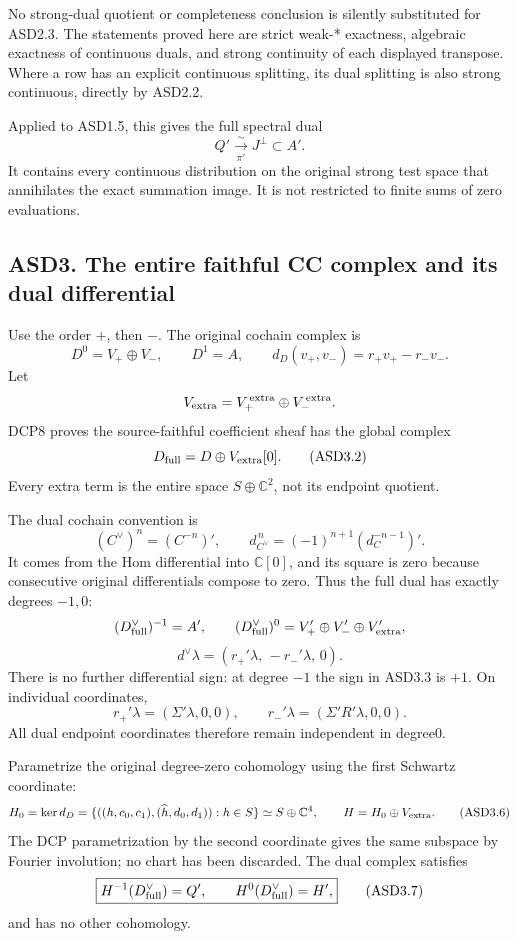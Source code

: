 No strong-dual quotient or completeness conclusion is silently
substituted for ASD2.3. The statements proved here are strict weak-*
exactness, algebraic exactness of continuous duals, and strong
continuity of each displayed transpose. Where a row has an explicit
continuous splitting, its dual splitting is also strong continuous,
directly by ASD2.2.

Applied to ASD1.5, this gives the full spectral dual \[
 \boxed{Q'\xrightarrow[\pi']{\ \sim\ }J^\perp\subset A'.}
 \tag{ASD2.4}
\] It contains every continuous distribution on the original strong test
space that annihilates the exact summation image. It is not restricted
to finite sums of zero evaluations.

\subsection{ASD3. The entire faithful CC complex and its dual
differential}\label{asd3.-the-entire-faithful-cc-complex-and-its-dual-differential}

Use the order \(+\), then \(-\). The original cochain complex is \[
 D^0=V_+\oplus V_-,\qquad D^1=A,\qquad
 d_D(v_+,v_-)=r_+v_+-r_-v_-.
 \tag{ASD3.1}
\] Let \[
 V_{\rm extra}=V_+^{\,{\rm extra}}\oplus V_-^{\,{\rm extra}}.
\] DCP8 proves the source-faithful coefficient sheaf has the global
complex \[
 D_{\rm full}=D\oplus V_{\rm extra}[0].
 \tag{ASD3.2}
\] Every extra term is the entire space \(S\oplus\mathbb C^2\), not its
endpoint quotient.

The dual cochain convention is \[
 (C^\vee)^n=(C^{-n})',\qquad
 d_{C^\vee}^{\,n}=(-1)^{n+1}(d_C^{-n-1})'.
 \tag{ASD3.3}
\] It comes from the Hom differential into \(\mathbb C[0]\), and its
square is zero because consecutive original differentials compose to
zero. Thus the full dual has exactly degrees \(-1,0\): \[
 (D_{\rm full}^\vee)^{-1}=A',\qquad
 (D_{\rm full}^\vee)^0=V_+'\oplus V_-'\oplus V_{\rm extra}',
\] \[
 d^\vee\lambda=(r_+'\lambda,\,-r_-'\lambda,\,0).
 \tag{ASD3.4}
\] There is no further differential sign: at degree \(-1\) the sign in
ASD3.3 is \(+1\). On individual coordinates, \[
 r_+'\lambda=(\Sigma'\lambda,0,0),\qquad
 r_-'\lambda=(\Sigma'R'\lambda,0,0).
 \tag{ASD3.5}
\] All dual endpoint coordinates therefore remain independent in
degree0.

Parametrize the original degree-zero cohomology using the first Schwartz
coordinate: \[
 H_0=\ker d_D
 =\{((h,c_0,c_1),(\widehat h,d_0,d_1)):h\in S\}
 \simeq S\oplus\mathbb C^4,
\qquad H=H_0\oplus V_{\rm extra}.
 \tag{ASD3.6}
\] The DCP parametrization by the second coordinate gives the same
subspace by Fourier involution; no chart has been discarded. The dual
complex satisfies \[
 \boxed{H^{-1}(D_{\rm full}^\vee)=Q',\qquad
 H^0(D_{\rm full}^\vee)=H',}
 \tag{ASD3.7}
\] and has no other cohomology.


